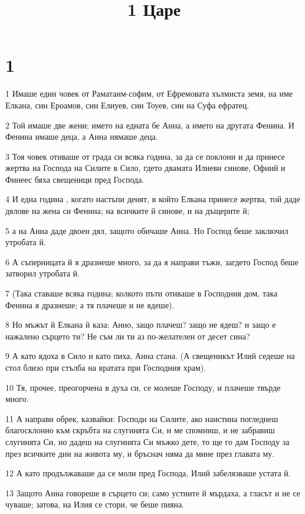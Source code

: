 

\title{1 Царе}


\chapter{1}

\par 1 Имаше един човек от Раматаим-софим, от Ефремовата хълмиста земя, на име Елкана, син Ероамов, син Елиуев, син Тоуев, син на Суфа ефратец.
\par 2 Той имаше две жени; името на едната бе Анна, а името на другата Фенина. И Фенина имаше деца, а Анна нямаше деца.
\par 3 Тоя човек отиваше от града си всяка година, за да се поклони и да принесе жертва на Господа на Силите в Сило, гдето двамата Илиеви синове, Офний и Финеес бяха свещеници пред Господа.
\par 4 И една година , когато настъпи денят, в който Елкана принесе жертва, той даде дялове на жена си Фенина; на всичките й синове, и на дъщерите й;
\par 5 а на Анна даде двоен дял, защото обичаше Анна. Но Господ беше заключил утробата й.
\par 6 А съперницата й я дразнеше много, за да я направи тъжи, загдето Господ беше затворил утробата й.
\par 7 (Така ставаше всяка година; колкото пъти отиваше в Господния дом, така Фенина я дразнеше; а тя плачеше и не ядеше).
\par 8 Но мъжът й Елкана й каза: Анно, защо плачеш? защо не ядеш? и защо е нажалено сърцето ти? Не съм ли ти аз по-желателен от десет сина?
\par 9 А като ядоха в Сило и като пиха, Анна стана. (А свещеникът Илий седеше на стол близо при стълба на вратата при Господния храм).
\par 10 Тя, прочее, преогорчена в духа си, се молеше Господу, и плачеше твърде много.
\par 11 А направи обрек, казвайки: Господи на Силите, ако наистина погледнеш благосклонно към скръбта на слугинята Си, и ме спомниш, и не забравиш слугинята Си, но дадеш на слугинята Си мъжко дете, то ще го дам Господу за през всичките дни на живота му, и бръснач няма да мине през главата му.
\par 12 А като продължаваше да се моли пред Господа, Илий забелязваше устата й.
\par 13 Защото Анна говореше в сърцето си; само устните й мърдаха, а гласът и не се чуваше; затова, на Илия се стори, че беше пияна.

